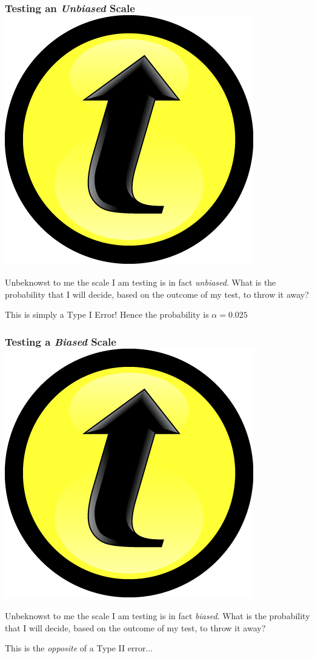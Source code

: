 \documentclass[handout]{beamer}
\begin{document}
\begin{frame}
	\frametitle{Testing an \emph{Unbiased} Scale\hfill \includegraphics[scale = 0.05]{./images/clicker}}
	 Unbeknowst to me the scale I am testing is in fact \emph{unbiased}.
	 What is the probability that I will decide, based on the outcome of my test, to throw it away?

	 \vspace{2em}
	\pause

	\alert{This is simply a Type I Error! Hence the probability is $\alpha = 0.025$}
\end{frame}
\begin{frame}
	\frametitle{Testing a \emph{Biased} Scale\hfill \includegraphics[scale = 0.05]{./images/clicker}}
	 Unbeknowst to me the scale I am testing is in fact \emph{biased}.
	 What is the probability that I will decide, based on the outcome of my test, to throw it away?

\pause

\vspace{1em}

\alert{This is the \emph{opposite} of a Type II error...}
\end{frame}
\end{document}
